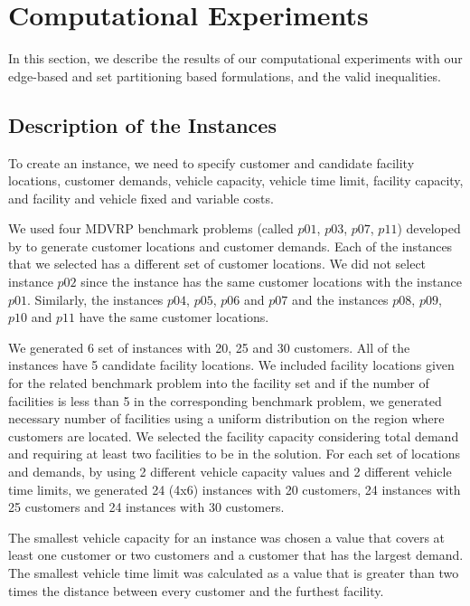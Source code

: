 \chapter{Computational Experiments} 

\label{part1:computationalexp}
In this section, we describe the results of our computational experiments with
our edge-based and set partitioning based formulations, and the valid inequalities.

\section{Description of the Instances}
\label{part1:instances}

To create an instance, we need to specify customer and candidate facility locations, 
customer demands, vehicle capacity, vehicle time limit, facility capacity, 
and facility and vehicle fixed and variable costs. 

We used four MDVRP benchmark problems (called $p01$, $p03$, $p07$, $p11$) 
developed by \citet{Cordeau2} to generate customer locations and customer demands. 
Each of the \citet{Cordeau2} instances that we selected has a different set of customer 
locations. We did not select instance $p02$ since the instance has the same customer 
locations with the instance $p01$. Similarly, the instances $p04$, $p05$, $p06$
and $p07$ and the instances $p08$, $p09$, $p10$ and $p11$ have the same customer locations.


We generated 6 set of instances with 20, 25 and 30 customers. All of the instances have 
5 candidate facility locations. We included facility locations given for the related 
benchmark problem into the facility set and if the number of facilities is less than 
5 in the corresponding benchmark problem, we generated necessary number of facilities 
using a uniform distribution on the region where customers are located. 
We selected the facility capacity considering total demand and requiring at least 
two facilities to be in the solution. For each set of locations and demands, by using 2 
different vehicle capacity values and 2 different vehicle time limits, 
we generated 24 (4x6) instances with 20 customers, 24 instances with 25 customers
and 24 instances  with 30 customers. 

The smallest vehicle capacity for an instance was chosen a value that covers at least 
one customer or two customers and a customer that has the largest demand. The smallest 
vehicle time limit was calculated as a value that is greater than two times the distance 
between every customer and the furthest facility.

